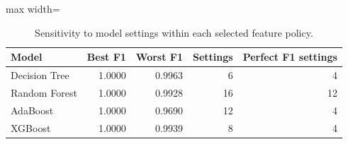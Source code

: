 \begin{table}[H]
\centering\small
\caption{Sensitivity to model settings within each selected feature policy.}
\begin{adjustbox}{max width=\linewidth}\begin{tabular}{lrrrr}
\toprule
Model & Best F1 & Worst F1 & Settings & Perfect F1 settings \\
\midrule
Decision Tree & 1.0000 & 0.9963 & 6 & 4 \\
Random Forest & 1.0000 & 0.9928 & 16 & 12 \\
AdaBoost & 1.0000 & 0.9690 & 12 & 4 \\
XGBoost & 1.0000 & 0.9939 & 8 & 4 \\
\bottomrule
\end{tabular}\end{adjustbox}
\end{table}
